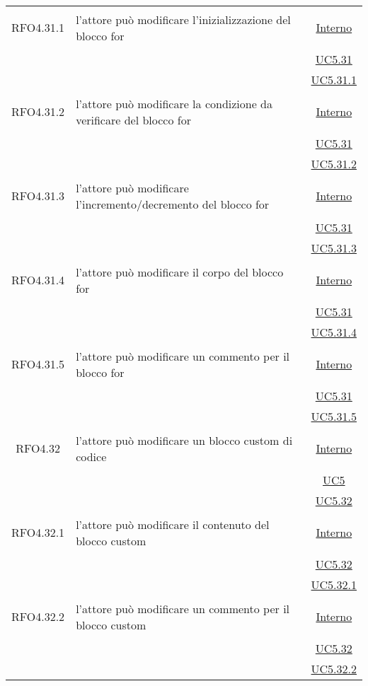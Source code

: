 \begin{longtable}{|c|>{\centering}m{7cm}|c|}
\hypertarget{RFO4.31.1}{RFO4.31.1} & l'attore può modificare l'inizializzazione del blocco for & \hyperlink{Interno}{Interno}\\
& &\hyperref[UC5.31]{UC5.31}\\
& &\hyperref[UC5.31.1]{UC5.31.1}\\ \hline

\hypertarget{RFO4.31.2}{RFO4.31.2} & l'attore può modificare la condizione da verificare del blocco for & \hyperlink{Interno}{Interno}\\
& &\hyperref[UC5.31]{UC5.31}\\
& &\hyperref[UC5.31.2]{UC5.31.2}\\ \hline

\hypertarget{RFO4.31.3}{RFO4.31.3} & l'attore può modificare l'incremento/decremento del blocco for & \hyperlink{Interno}{Interno}\\
& &\hyperref[UC5.31]{UC5.31}\\
& &\hyperref[UC5.31.3]{UC5.31.3}\\ \hline

\hypertarget{RFO4.31.4}{RFO4.31.4} & l'attore può modificare il corpo del blocco for &\hyperlink{Interno}{Interno}\\
& &\hyperref[UC5.31]{UC5.31}\\
& &\hyperref[UC5.31.4]{UC5.31.4}\\ \hline

\hypertarget{RFO4.31.5}{RFO4.31.5} & l'attore può modificare un commento per il blocco for & \hyperlink{Interno}{Interno}\\
& &\hyperref[UC5.31]{UC5.31}\\
& &\hyperref[UC5.31.5]{UC5.31.5}\\ \hline

\hypertarget{RFO4.32}{RFO4.32} & l'attore può modificare un blocco custom di codice & \hyperlink{Interno}{Interno}\\
& &\hyperref[UC5]{UC5}\\
& &\hyperref[UC5.32]{UC5.32}\\ \hline

\hypertarget{RFO4.32.1}{RFO4.32.1} & l'attore può modificare il contenuto del blocco custom & \hyperlink{Interno}{Interno}\\
& &\hyperref[UC5.32]{UC5.32}\\
& &\hyperref[UC5.32.1]{UC5.32.1}\\ \hline

\hypertarget{RFO4.32.2}{RFO4.32.2} & l'attore può modificare un commento per il blocco custom & \hyperlink{Interno}{Interno}\\
& &\hyperref[UC5.32]{UC5.32}\\
& &\hyperref[UC5.32.2]{UC5.32.2}\\ \hline


\end{longtable}
